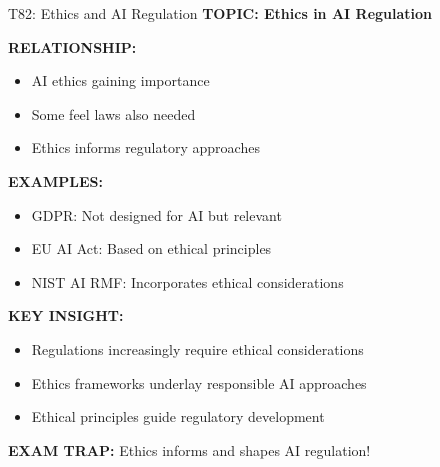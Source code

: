 \documentclass[8pt]{beamer}
\begin{document}
	\begin{frame}{T82: Ethics and AI Regulation}
		\fontsize{6.5}{7.5}\selectfont
		\textbf{TOPIC: Ethics in AI Regulation}
		
		\vspace{0.1cm}
		\textbf{RELATIONSHIP:}
		\begin{itemize}
			\item AI ethics gaining importance
			\item Some feel laws also needed
			\item Ethics informs regulatory approaches
		\end{itemize}
		
		\vspace{0.1cm}
		\textbf{EXAMPLES:}
		\begin{itemize}
			\item GDPR: Not designed for AI but relevant
			\item EU AI Act: Based on ethical principles
			\item NIST AI RMF: Incorporates ethical considerations
		\end{itemize}
		
		\vspace{0.1cm}
		\textbf{KEY INSIGHT:}
		\begin{itemize}
			\item Regulations increasingly require ethical considerations
			\item Ethics frameworks underlay responsible AI approaches
			\item Ethical principles guide regulatory development
		\end{itemize}
		
		\textcolor{myred}{\textbf{EXAM TRAP:}} Ethics \textcolor{myblue}{informs and shapes} AI regulation!
	\end{frame}
	
	
\end{document}
